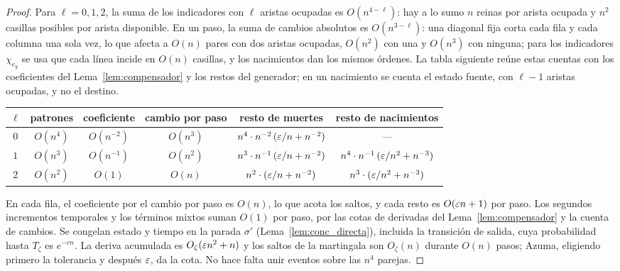 \begin{proof}
Para $\ell=0,1,2$, la suma de los indicadores con $\ell$ aristas ocupadas es $O(n^{4-\ell})$: hay
a lo sumo $n$ reinas por arista ocupada y $n^2$ casillas posibles por arista disponible. En un paso, la
suma de cambios absolutos es $O(n^{3-\ell})$: una diagonal fija corta cada fila y cada columna
una sola vez, lo que afecta a $O(n)$ pares con dos aristas ocupadas, $O(n^2)$ con una y $O(n^3)$
con ninguna; para los indicadores $\chi_{e_g}$ se usa que cada línea incide en $O(n)$ casillas,
y los nacimientos dan los mismos órdenes. La tabla siguiente reúne estas cuentas con los
coeficientes del Lema~\ref{lem:compensador} y los restos del generador; en un nacimiento se cuenta
el estado fuente, con $\ell-1$ aristas ocupadas, y no el destino.
\begin{center}\small
\begin{tabular}{@{}cccccc@{}}
\toprule
$\ell$ & patrones & coeficiente & cambio por paso & resto de muertes & resto de nacimientos\\
\midrule
$0$ & $O(n^4)$ & $O(n^{-2})$ & $O(n^3)$ & $n^4\cdot n^{-2}\,(\varepsilon/n+n^{-2})$ & ---\\
$1$ & $O(n^3)$ & $O(n^{-1})$ & $O(n^2)$ & $n^3\cdot n^{-1}\,(\varepsilon/n+n^{-2})$
 & $n^4\cdot n^{-1}\,(\varepsilon/n^2+n^{-3})$\\
$2$ & $O(n^2)$ & $O(1)$ & $O(n)$ & $n^2\cdot(\varepsilon/n+n^{-2})$ & $n^3\cdot(\varepsilon/n^2+n^{-3})$\\
\bottomrule
\end{tabular}
\end{center}
En cada fila, el coeficiente por el cambio por paso es $O(n)$, lo que acota los saltos, y cada
resto es $O(\varepsilon n+1)$ por paso. Los segundos
incrementos temporales y los términos mixtos suman $O(1)$ por paso, por las cotas de derivadas
del Lema~\ref{lem:compensador} y la cuenta de cambios. Se congelan estado y tiempo en la parada
$\sigma'$ (Lema~\ref{lem:conc_directa}), incluida la transición de salida, cuya probabilidad
hasta $T_\zeta$ es $e^{-cn}$. La deriva acumulada es $O_\zeta(\varepsilon n^2+n)$ y los saltos de la
martingala son $O_\zeta(n)$ durante $O(n)$ pasos; Azuma, eligiendo primero la tolerancia y
después $\varepsilon$, da la cota. No hace falta unir eventos sobre las $n^4$ parejas.
\end{proof}
